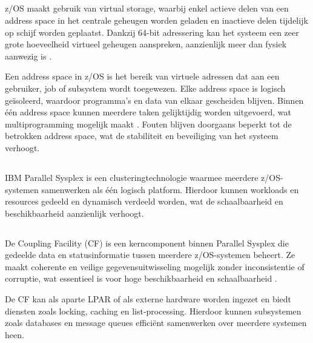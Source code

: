 \subsection{}
\label{sec:adress-spaces}

z/OS maakt gebruik van virtual storage, waarbij enkel actieve delen van een address space in het centrale geheugen worden geladen en inactieve delen tijdelijk op schijf worden geplaatst. Dankzij 64-bit adressering kan het systeem een zeer grote hoeveelheid virtueel geheugen aanspreken, aanzienlijk meer dan fysiek aanwezig is \autocite{IBM_zOS_Concepts}.

Een address space in z/OS is het bereik van virtuele adressen dat aan een gebruiker, job of subsystem wordt toegewezen. Elke address space is logisch geïsoleerd, waardoor programma’s en data van elkaar gescheiden blijven. Binnen één address space kunnen meerdere taken gelijktijdig worden uitgevoerd, wat multiprogramming mogelijk maakt \autocite{IBM_zOS_Concepts}. Fouten blijven doorgaans beperkt tot de betrokken address space, wat de stabiliteit en beveiliging van het systeem verhoogt.


\subsection{}
\label{sec:parallel-sysplex}

IBM Parallel Sysplex is een clusteringtechnologie waarmee meerdere z/OS-systemen samenwerken als één logisch platform. Hierdoor kunnen workloads en resources gedeeld en dynamisch verdeeld worden, wat de schaalbaarheid en beschikbaarheid aanzienlijk verhoogt. \autocite{ibm_parallel_sysplex}

\subsection{}
\label{sec:coupling-facility}

De Coupling Facility (CF) is een kerncomponent binnen Parallel Sysplex die gedeelde data en statusinformatie tussen meerdere z/OS-systemen beheert. Ze maakt coherente en veilige gegevensuitwisseling mogelijk zonder inconsistentie of corruptie, wat essentieel is voor hoge beschikbaarheid en schaalbaarheid \autocite{ibm_parallel_sysplex}.

De CF kan als aparte LPAR of als externe hardware worden ingezet en biedt diensten zoals locking, caching en list-processing. Hierdoor kunnen subsystemen zoals databases en message queues efficiënt samenwerken over meerdere systemen heen.

